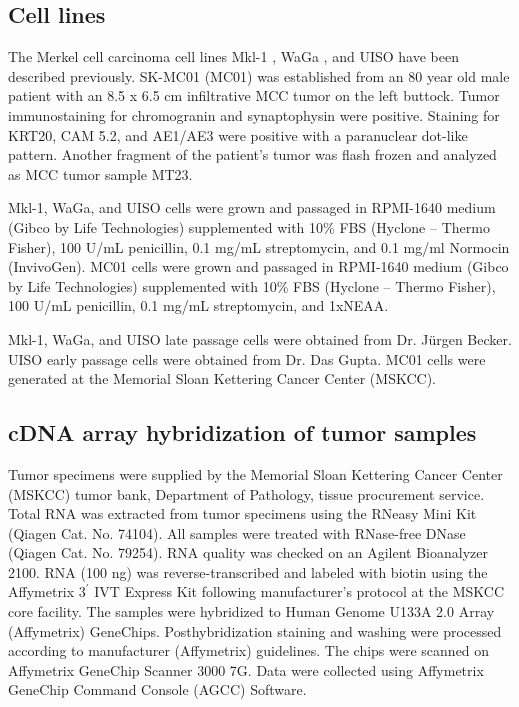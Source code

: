 \documentclass[10pt]{article}
\begin{document}
\subsection*{Cell lines}
The Merkel cell carcinoma cell lines Mkl-1 \citep{Rosen1987Establishment}, WaGa \citep{Houben2010Merkel}, and UISO \citep{Ronan1993Merkel} have been described previously.
SK-MC01 (MC01) was established from an 80 year old male patient with an 8.5 x 6.5 cm infiltrative MCC tumor on the left buttock.
Tumor immunostaining for chromogranin and synaptophysin were positive.
Staining for KRT20, CAM 5.2, and AE1/AE3 were positive with a paranuclear dot-like pattern.
Another fragment of the patient’s tumor was flash frozen and analyzed as MCC tumor sample MT23.

Mkl-1, WaGa, and UISO cells were grown and passaged in RPMI-1640 medium (Gibco by Life Technologies) supplemented with 10\% FBS (Hyclone – Thermo Fisher), 100 U/mL penicillin, 0.1 mg/mL streptomycin, and 0.1 mg/ml Normocin (InvivoGen).
MC01 cells were grown and passaged in RPMI-1640 medium (Gibco by Life Technologies) supplemented with 10\% FBS (Hyclone – Thermo Fisher), 100 U/mL penicillin, 0.1 mg/mL streptomycin, and 1xNEAA.

Mkl-1, WaGa, and UISO late passage cells were obtained from Dr. J\"{u}rgen Becker.
UISO early passage cells were obtained from Dr. Das Gupta.
MC01 cells were generated at the Memorial Sloan Kettering Cancer Center (MSKCC).

\subsection*{cDNA array hybridization of tumor samples}
Tumor specimens were supplied by the Memorial Sloan Kettering Cancer Center (MSKCC) tumor bank, Department of Pathology, tissue procurement service.
Total RNA was extracted from tumor specimens using the RNeasy Mini Kit (Qiagen Cat. No. 74104).
All samples were treated with RNase-free DNase (Qiagen Cat. No. 79254).
RNA quality was checked on an Agilent Bioanalyzer 2100.
RNA (100 ng) was reverse-transcribed and labeled with biotin using the Affymetrix $3^{\prime}$ IVT Express Kit following manufacturer's protocol at the MSKCC core facility.
The samples were hybridized to Human Genome U133A 2.0 Array (Affymetrix) GeneChips.
Posthybridization staining and washing were processed according to manufacturer (Affymetrix) guidelines.
The chips were scanned on Affymetrix GeneChip Scanner 3000 7G.
Data were collected using Affymetrix GeneChip Command Console (AGCC) Software.
\end{document}
